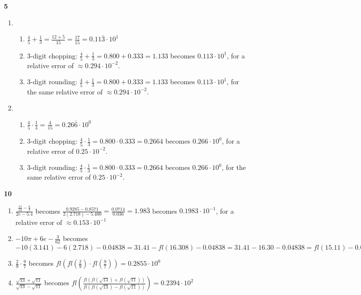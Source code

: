 \documentclass{article}
\newcommand{\paren}[1]{\left( #1 \right)}
\begin{document}

\textbf{5} %
\begin{enumerate}
    \item 
    \begin{enumerate}
        \renewcommand{\labelenumii}{(\roman{enumii})}
        \item $\frac{4}{5} + \frac{1}{3} = \frac{12 + 5}{15} = \frac{17}{15} = 0.11\bar{3} \cdot 10^{1}$
        \item 3-digit chopping: $\frac{4}{5} + \frac{1}{3} = 0.800 + 0.333 = 1.133$ becomes $0.113 \cdot 10^{1}$, for a relative error of $\approx 0.294 \cdot 10^{-2}$.
        \item 3-digit rounding: $\frac{4}{5} + \frac{1}{3} = 0.800 + 0.333 = 1.133$ becomes $0.113 \cdot 10^{1}$, for the same relative error of $\approx 0.294 \cdot 10^{-2}$.
    \end{enumerate}

    \item 
    \begin{enumerate}
        \item $\frac{4}{5} \cdot \frac{1}{3}  = \frac{4}{15} = 0.26\bar{6} \cdot 10^{0}$
        \item 3-digit chopping: $\frac{4}{5} \cdot \frac{1}{3} = 0.800 \cdot 0.333 = 0.2664$ becomes $0.266 \cdot 10^{0}$, for a relative error of $0.25 \cdot 10^{-2}$.
        \item 3-digit rounding: $\frac{4}{5} \cdot \frac{1}{3} = 0.800 \cdot 0.333 = 0.2664$ becomes $0.266 \cdot 10^{0}$, for the same relative error of $0.25 \cdot 10^{-2}$.        
    \end{enumerate}
\end{enumerate}


\textbf{10}
\begin{enumerate}
    \item $\displaystyle \frac{\frac{13}{14}-\frac{6}{7}}{2e - 5.4}$ becomes $\frac{0.9285 - 0.8571}{2(2.718) - 5.400} = \frac{0.0714}{0.036} = 1.98\bar{3}$ becomes $0.1983 \cdot 10^{-1}$, for a relative error of $\approx 0.153 \cdot 10^{-1}$
    \item $\displaystyle -10\pi + 6e - \frac{3}{62}$ becomes $-10(3.141) - 6(2.718) - 0.04838 = 31.41 - fl(16.308) - 0.04838 = 31.41 - 16.30 - 0.04838 = fl(15.11) - 0.04838 = fl(15.06162) = 0.1506 \cdot 10^{2}$
    \item $\displaystyle \frac{2}{9} \cdot \frac{9}{7}$ becomes $fl\paren{fl\paren{\frac{2}{9}} \cdot fl\paren{\frac{9}{7}}} = 0.2855 \cdot 10^{0}$
    \item $\displaystyle \frac{\sqrt{13} + \sqrt{11}}{\sqrt{13} - \sqrt{11}}$ becomes $fl\paren{\frac{fl\paren{fl\paren{\sqrt{13}} + fl\paren{\sqrt{11}}}}{fl\paren{fl\paren{\sqrt{13}} - fl\paren{\sqrt{11}}}}} = 0.2394 \cdot 10^{2}$
\end{enumerate}
\end{document}
